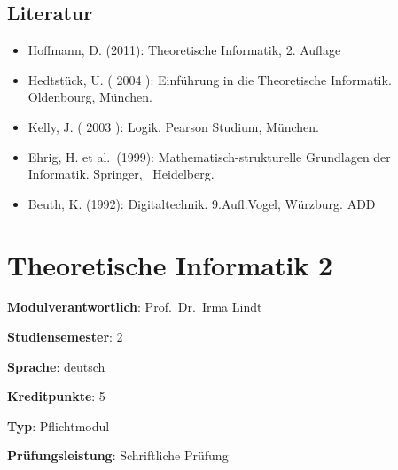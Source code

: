 \hypertarget{literaturpathlabelmi-2017modulbeschreibungen-bachelorba_theoretischeinformatik1}{%
\section*{Literatur\label{/mi-2017/modulbeschreibungen-bachelor/BA_TheoretischeInformatik1}}\label{literaturpathlabelmi-2017modulbeschreibungen-bachelorba_theoretischeinformatik1}}

\begin{itemize}
\tightlist
\item
  Hoffmann, D. (2011): Theoretische Informatik, 2. Auflage
\item
  Hedtstück, U. ( 2004 ): Einführung in die Theoretische Informatik.
  Oldenbourg, München.
\item
  Kelly, J. ( 2003 ): Logik. Pearson Studium, München.
\item
  Ehrig, H. et al.~(1999): Mathematisch-strukturelle Grundlagen der
  Informatik. Springer,~ Heidelberg.
\item
  Beuth, K. (1992): Digitaltechnik. 9.Aufl.Vogel, Würzburg. ADD
\end{itemize}

\hypertarget{theoretische-informatik-2pathlabelmi-2017modulbeschreibungen-bachelorba_theoretischeinformatik2}{%
\chapter{Theoretische Informatik
2\label{/mi-2017/modulbeschreibungen-bachelor/BA_TheoretischeInformatik2}}\label{theoretische-informatik-2pathlabelmi-2017modulbeschreibungen-bachelorba_theoretischeinformatik2}}

\begin{modulHead}
\textbf{Modulverantwortlich}: Prof.~Dr.~Irma
Lindt
\end{modulHead}
\begin{modulHead}
\textbf{Studiensemester}:
2
\end{modulHead}
\begin{modulHead}
\textbf{Sprache}:
deutsch
\end{modulHead}
\begin{modulHead}
\textbf{Kreditpunkte}:
5
\end{modulHead}
\begin{modulHead}
\textbf{Typ}:
Pflichtmodul
\end{modulHead}
\begin{modulHead}
\textbf{Prüfungsleistung}:
Schriftliche Prüfung
\end{modulHead}


